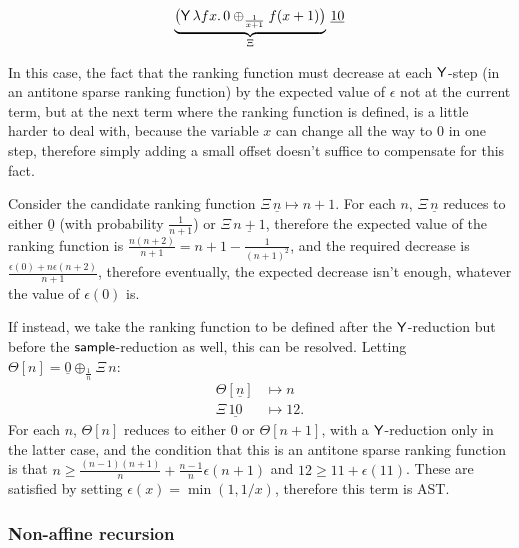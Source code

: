 \begin{example}
\label{ex:escaping spline}\cite[\S 5.4]{DBLP:journals/pacmpl/McIverMKK18}
\[
\underbrace{\big
(\mathsf{Y} \, \lambda f x . \,
0 \oplus_{\frac{1}{x+1}} f(x + 1) \big)}_{\Xi} 
\, \underline{10}
\]

In this case, the fact that the ranking function must decrease at each $\mathsf{Y}$-step (in an antitone sparse ranking function) by the expected value of $\epsilon$ not at the current term, but at the next term where the ranking function is defined, is a little harder to deal with, because the variable $x$ can change all the way to $0$ in one step, therefore simply adding a small offset doesn't suffice to compensate for this fact.

Consider the candidate ranking function $\Xi \, \underline n \mapsto n + 1$. For each $n$, $\Xi \, \underline n$ reduces to either $\underline 0$ (with probability $\frac 1 {n + 1}$) or $\Xi \, \underline{n + 1}$, therefore the expected value of the ranking function is $\frac{n(n+2)}{n+1} = n + 1 - \frac 1 {(n+1)^2}$, and the required decrease is $\frac{\epsilon(0) + n \epsilon(n + 2)}{n + 1}$, therefore eventually, the expected decrease isn't enough, whatever the value of $\epsilon(0)$ is.

If instead, we take the ranking function to be defined after the $\mathsf{Y}$-reduction but before the $\mathsf{sample}$-reduction as well, this can be resolved. Letting $\Theta[n] = \underline 0 \oplus_{\frac 1 n} \Xi \, n$:
\begin{align*}
\Theta[\underline n] &\mapsto n \\
\Xi \, \underline{10} & \mapsto 12.
\end{align*}
For each $n$, $\Theta[n]$ reduces to either $0$ or $\Theta[n+1]$, with a $\mathsf{Y}$-reduction only in the latter case, and the condition that this is an antitone sparse ranking function is that $n \geq \frac{(n-1)(n+1)}{n} + \frac{n-1}{n} \epsilon(n+1)$ and $12 \geq 11 + \epsilon(11)$. These are satisfied by setting $\epsilon(x) = \min(1, 1/x)$, therefore this term is AST.
\end{example}


\subsubsection*{Non-affine recursion}

